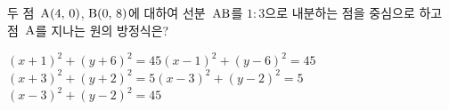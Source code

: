 두 점~$\mathrm{A}(4,\,0)$, $\mathrm{B}(0,\,8)$에 대하여 선분~$\mathrm{AB}$를 $1:3$으로 내분하는 점을 중심으로 하고 점~$\mathrm{A}$를 지나는 원의 방정식은?
\begin{choicesv}{$(x+1)^2+(y+6)^2=45$}{$(x-1)^2+(y-6)^2=45$}{$(x+3)^2+(y+2)^2=5$}{$(x-3)^2+(y-2)^2=5$}{$(x-3)^2+(y-2)^2=45$}\end{choicesv}
